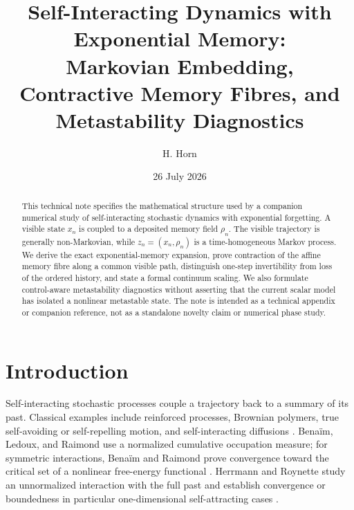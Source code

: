 \documentclass[preprint,amsmath,amssymb,aps,prd,nofootinbib,floatfix]{revtex4-2}
\begin{document}
\title{Self-Interacting Dynamics with Exponential Memory:\\
Markovian Embedding, Contractive Memory Fibres, and Metastability Diagnostics}

\author{H. Horn}

\date{26 July 2026}

\begin{abstract}
This technical note specifies the mathematical structure used by a companion
numerical study of self-interacting stochastic dynamics with exponential
forgetting.
A visible state $x_n$ is coupled to a deposited memory field $\rho_n$.
The visible trajectory is generally non-Markovian, while
$z_n=(x_n,\rho_n)$ is a time-homogeneous Markov process.
We derive the exact exponential-memory expansion, prove contraction of the
affine memory fibre along a common visible path, distinguish one-step
invertibility from loss of the ordered history, and state a formal continuum
scaling.
We also formulate control-aware metastability diagnostics without asserting
that the current scalar model has isolated a nonlinear metastable state.
The note is intended as a technical appendix or companion reference, not as a
standalone novelty claim or numerical phase study.
\end{abstract}

\maketitle

\section{Introduction}

Self-interacting stochastic processes couple a trajectory back to a summary of
its past.
Classical examples include reinforced processes, Brownian polymers, true
self-avoiding or self-repelling motion, and self-interacting diffusions
\cite{Pemantle2007,DurrettRogers1992,AmitParisiPeliti1983,
TothWerner1998,PelitiPietronero1987}.
Bena\"im, Ledoux, and Raimond use a normalized cumulative occupation measure;
for symmetric interactions, Bena\"im and Raimond prove convergence toward the
critical set of a nonlinear free-energy functional
\cite{BenAImRaimond2002,BenaimRaimond2005}.
Herrmann and Roynette study an unnormalized interaction with the full past and
establish convergence or boundedness in particular one-dimensional
self-attracting cases \cite{HerrmannRoynette2003}.
\end{document}
